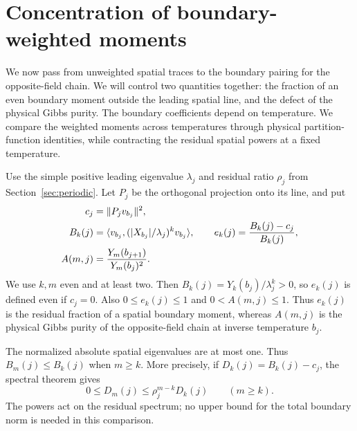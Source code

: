 \section{Concentration of boundary-weighted moments}\label{sec:boundary}
We now pass from unweighted spatial traces to the boundary pairing for
the opposite-field chain. We will control two quantities together: the
fraction of an even boundary moment outside the leading spatial line,
and the defect of the physical Gibbs purity. The boundary coefficients
depend on temperature. We compare the weighted moments across temperatures
through physical partition-function identities, while contracting the
residual spatial powers at a fixed temperature.

Use the simple positive leading eigenvalue $\lambda_j$ and residual
ratio $\rho_j$ from Section~\ref{sec:periodic}. Let $P_j$ be the
orthogonal projection onto its line, and put
\begin{equation}\label{be:definitions}
 \begin{split}
 c_j&=\lVert P_jv_{b_j}\rVert^2,\\
 B_k(j)&=\langle v_{b_j},(|X_{b_j}|/\lambda_j)^k v_{b_j}\rangle,
 \qquad e_k(j)=\frac{B_k(j)-c_j}{B_k(j)},\\
 A(m,j)&=\frac{Y_m(b_{j+1})}{Y_m(b_j)^2}.
 \end{split}
\end{equation}
We use $k,m$ even and at least two. Then
$B_k(j)=Y_k(b_j)/\lambda_j^k>0$, so $e_k(j)$ is defined even if
$c_j=0$. Also $0\le e_k(j)\le1$ and $0<A(m,j)\le1$.
Thus $e_k(j)$ is the residual fraction of a spatial boundary moment,
whereas $A(m,j)$ is the physical Gibbs purity of the opposite-field
chain at inverse temperature $b_j$.

The normalized absolute spatial eigenvalues are at most one. Thus
$B_m(j)\le B_k(j)$ when $m\ge k$. More precisely, if
$D_k(j)=B_k(j)-c_j$, the spectral theorem gives
\begin{equation}\label{be:residual}
 0\le D_m(j)\le\rho_j^{m-k}D_k(j)\qquad(m\ge k).
\end{equation}
The powers act on the residual spectrum; no upper bound for the total
boundary norm is needed in this comparison.

